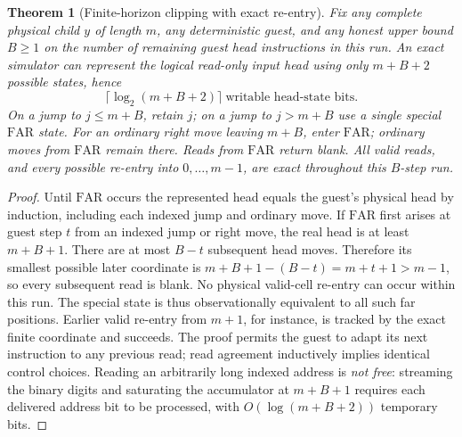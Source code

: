 \documentclass[11pt]{article}
\newtheorem{theorem}{Theorem}
\begin{document}
\begin{theorem}[Finite-horizon clipping with exact re-entry]
Fix any complete physical child $y$ of length $m$, any deterministic guest, and any \emph{honest} upper bound $B\ge1$ on the number of remaining guest head instructions in this run. An exact simulator can represent the logical read-only input head using only $m+B+2$ possible states, hence
\[
\boxed{\,\lceil\log_2(m+B+2)\rceil\ \text{writable head-state bits}.\,}
\]
On a jump to $j\le m+B$, retain $j$; on a jump to $j>m+B$ use a single special $\mathrm{FAR}$ state. For an ordinary right move leaving $m+B$, enter $\mathrm{FAR}$; ordinary moves from $\mathrm{FAR}$ remain there. Reads from $\mathrm{FAR}$ return blank. All valid reads, and every possible re-entry into $0,\ldots,m-1$, are exact throughout this $B$-step run.
\end{theorem}
\begin{proof}
Until $\mathrm{FAR}$ occurs the represented head equals the guest's physical head by induction, including each indexed jump and ordinary move. If $\mathrm{FAR}$ first arises at guest step $t$ from an indexed jump or right move, the real head is at least $m+B+1$. There are at most $B-t$ subsequent head moves. Therefore its smallest possible later coordinate is $m+B+1-(B-t)=m+t+1>m-1$, so every subsequent read is blank. No physical valid-cell re-entry can occur within this run. The special state is thus observationally equivalent to all such far positions. Earlier valid re-entry from $m+1$, for instance, is tracked by the exact finite coordinate and succeeds. The proof permits the guest to adapt its next instruction to any previous read; read agreement inductively implies identical control choices. Reading an arbitrarily long indexed address is \emph{not free}: streaming the binary digits and saturating the accumulator at $m+B+1$ requires each delivered address bit to be processed, with $O(\log(m+B+2))$ temporary bits.
\end{proof}
\end{document}
